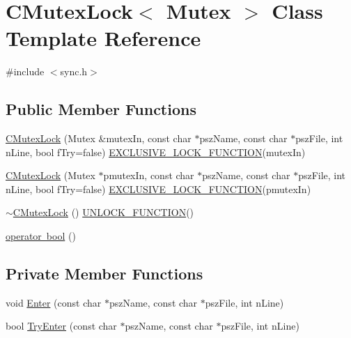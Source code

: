 \hypertarget{class_c_mutex_lock}{}\section{C\+Mutex\+Lock$<$ Mutex $>$ Class Template Reference}
\label{class_c_mutex_lock}


{\ttfamily \#include $<$sync.\+h$>$}

\subsection*{Public Member Functions}
\begin{DoxyCompactItemize}
\item 
\mbox{\hyperlink{class_c_mutex_lock_a5de553653dbbcc1432d07658fa9b0e8b}{C\+Mutex\+Lock}} (Mutex \&mutex\+In, const char $\ast$psz\+Name, const char $\ast$psz\+File, int n\+Line, bool f\+Try=false) \mbox{\hyperlink{threadsafety_8h_a77729163b7f6867da40ad5daa5f926f3}{E\+X\+C\+L\+U\+S\+I\+V\+E\+\_\+\+L\+O\+C\+K\+\_\+\+F\+U\+N\+C\+T\+I\+ON}}(mutex\+In)
\item 
\mbox{\hyperlink{class_c_mutex_lock_a4725b7154d87d0e0eb47c62d299963be}{C\+Mutex\+Lock}} (Mutex $\ast$pmutex\+In, const char $\ast$psz\+Name, const char $\ast$psz\+File, int n\+Line, bool f\+Try=false) \mbox{\hyperlink{threadsafety_8h_a77729163b7f6867da40ad5daa5f926f3}{E\+X\+C\+L\+U\+S\+I\+V\+E\+\_\+\+L\+O\+C\+K\+\_\+\+F\+U\+N\+C\+T\+I\+ON}}(pmutex\+In)
\item 
\mbox{\hyperlink{class_c_mutex_lock_af475e374b70ac03db516d00f65b723b7}{$\sim$\+C\+Mutex\+Lock}} () \mbox{\hyperlink{threadsafety_8h_abd56e19f9b4781b1a5212a46951cf5c3}{U\+N\+L\+O\+C\+K\+\_\+\+F\+U\+N\+C\+T\+I\+ON}}()
\item 
\mbox{\hyperlink{class_c_mutex_lock_a4358803c87a873252abebdd1b625d293}{operator bool}} ()
\end{DoxyCompactItemize}
\subsection*{Private Member Functions}
\begin{DoxyCompactItemize}
\item 
void \mbox{\hyperlink{class_c_mutex_lock_a8a9f734c76f1b766445bec41b91393dd}{Enter}} (const char $\ast$psz\+Name, const char $\ast$psz\+File, int n\+Line)
\item 
bool \mbox{\hyperlink{class_c_mutex_lock_a9ba3770fa3e256a183b0ee52ebf048c4}{Try\+Enter}} (const char $\ast$psz\+Name, const char $\ast$psz\+File, int n\+Line)
\end{DoxyCompactItemize}
